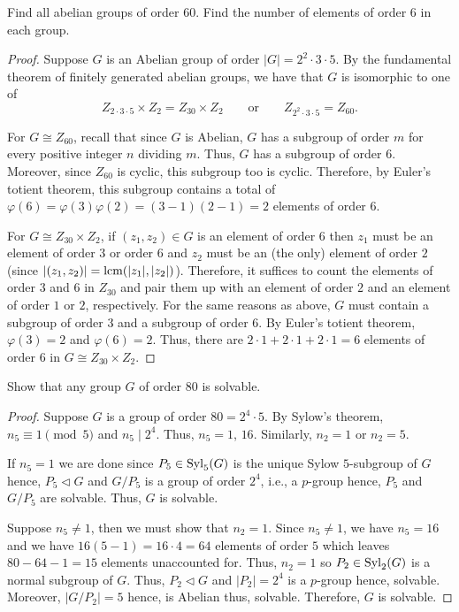 \begin{problem}
Find all abelian groups of order $60$. Find the number of elements of order
$6$ in each group.
\end{problem}
\begin{proof}
Suppose $G$ is an Abelian group of order $|G|=2^2\cdot 3\cdot 5$. By the
fundamental theorem of finitely generated abelian groups, we have that $G$
is isomorphic to one of
\[
Z_{2\cdot 3\cdot 5}\times Z_2=Z_{30}\times Z_2
\qquad\text{or}\qquad
Z_{2^2\cdot 3\cdot 5}=Z_{60}.
\]

For $G\cong Z_{60}$, recall that since $G$ is Abelian, $G$ has a subgroup
of order $m$ for every positive integer $n$ dividing $m$. Thus, $G$ has a
subgroup of order $6$. Moreover, since $Z_{60}$ is cyclic, this subgroup
too is cyclic. Therefore, by Euler's totient theorem, this subgroup
contains a total of $\varphi(6)=\varphi(3)\varphi(2)=(3-1)(2-1)=2$ elements
of order $6$.

For $G\cong Z_{30}\times Z_2$, if $(z_1,z_2)\in G$ is an element of order
$6$ then $z_1$ must be an element of order $3$ or order $6$ and $z_2$ must
be an (the only) element of order $2$ (since
$|(z_1,z_2)|=\operatorname{lcm}(|z_1|,|z_2|)$). Therefore, it suffices to count the
elements of order $3$ and $6$ in $Z_{30}$ and pair them up with an element
of order $2$ and an element of order $1$ or $2$, respectively. For the same
reasons as above, $G$ must contain a subgroup of order $3$ and a subgroup
of order $6$. By Euler's totient theorem, $\varphi(3)=2$ and
$\varphi(6)=2$. Thus, there are $2\cdot 1+2\cdot 1+2\cdot 1=6$ elements of
order $6$ in $G\cong Z_{30}\times Z_2$.
\end{proof}

\begin{problem}
Show that any group $G$ of order $80$ is solvable.
\end{problem}
\begin{proof}
Suppose $G$ is a group of order $80=2^4\cdot 5$. By Sylow's theorem,
$n_5\equiv 1\pmod{5}$ and $n_5\mid 2^4$. Thus, $n_5=1$, $16$. Similarly,
$n_2=1$ or $n_2=5$.

If $n_5=1$ we are done since $P_5\in\operatorname{Syl}_5(G)$ is the unique Sylow
$5$-subgroup of $G$ hence, $P_5\lhd G$ and $G/P_5$ is a group of order
$2^4$, i.e., a $p$-group hence, $P_5$ and $G/P_5$ are solvable. Thus, $G$
is solvable.

Suppose $n_5\neq 1$, then we must show that $n_2=1$. Since $n_5\neq 1$, we
have $n_5=16$ and we have $16(5-1)=16\cdot 4=64$ elements of order $5$
which leaves $80-64-1=15$ elements unaccounted for. Thus, $n_2=1$ so
$P_2\in\operatorname{Syl}_2(G)$ is a normal subgroup of $G$. Thus, $P_2\lhd G$ and
$|P_2|=2^4$ is a $p$-group hence, solvable. Moreover, $|G/P_2|=5$ hence, is
Abelian thus, solvable. Therefore, $G$ is solvable.
\end{proof}

